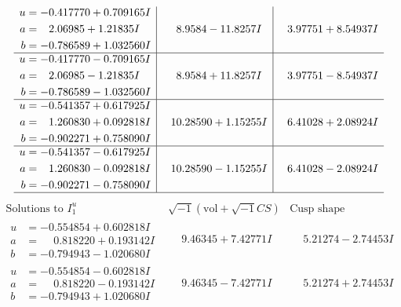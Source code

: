 \documentclass[1p]{elsarticle_modified}
\theoremstyle{definition}
\newcommand{\I}{\sqrt{-1}}
\begin{document}
$$\begin{array}{c|c|c}
\begin{aligned}
u &= -0.417770 + 0.709165 I \\
a &= \phantom{-}2.06985 + 1.21835 I \\
b &= -0.786589 + 1.032560 I\end{aligned}
 & \phantom{-}8.9584 - 11.8257 I & \phantom{-}3.97751 + 8.54937 I \\ \hline\begin{aligned}
u &= -0.417770 - 0.709165 I \\
a &= \phantom{-}2.06985 - 1.21835 I \\
b &= -0.786589 - 1.032560 I\end{aligned}
 & \phantom{-}8.9584 + 11.8257 I & \phantom{-}3.97751 - 8.54937 I \\ \hline\begin{aligned}
u &= -0.541357 + 0.617925 I \\
a &= \phantom{-}1.260830 + 0.092818 I \\
b &= -0.902271 + 0.758090 I\end{aligned}
 & \phantom{-}10.28590 + 1.15255 I & \phantom{-}6.41028 + 2.08924 I \\ \hline\begin{aligned}
u &= -0.541357 - 0.617925 I \\
a &= \phantom{-}1.260830 - 0.092818 I \\
b &= -0.902271 - 0.758090 I\end{aligned}
 & \phantom{-}10.28590 - 1.15255 I & \phantom{-}6.41028 - 2.08924 I\\
 \hline 
 \end{array}$$\newpage$$\begin{array}{c|c|c}  
\text{Solutions to }I^u_{1}& \I (\text{vol} + \sqrt{-1}CS) & \text{Cusp shape}\\
 \hline 
\begin{aligned}
u &= -0.554854 + 0.602818 I \\
a &= \phantom{-}0.818220 + 0.193142 I \\
b &= -0.794943 - 1.020680 I\end{aligned}
 & \phantom{-}9.46345 + 7.42771 I & \phantom{-}5.21274 - 2.74453 I \\ \hline\begin{aligned}
u &= -0.554854 - 0.602818 I \\
a &= \phantom{-}0.818220 - 0.193142 I \\
b &= -0.794943 + 1.020680 I\end{aligned}
 & \phantom{-}9.46345 - 7.42771 I & \phantom{-}5.21274 + 2.74453 I \\ \hline\begin{aligned}

\end{aligned}
\end{array}$$
\end{document}
